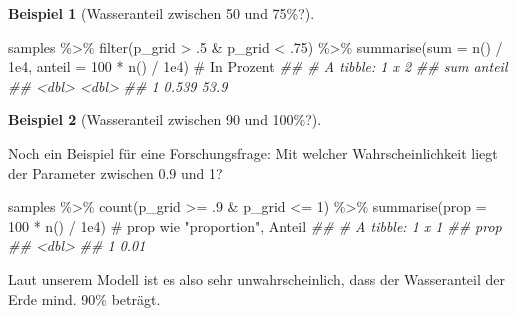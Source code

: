 \documentclass[
  a4paper,
  DIV=11]{scrreprt}
\newenvironment{Shaded}{\begin{snugshade}}{\end{snugshade}}
\newcommand{\AttributeTok}[1]{\textcolor[rgb]{0.40,0.45,0.13}{#1}}
\newcommand{\CommentTok}[1]{\textcolor[rgb]{0.37,0.37,0.37}{#1}}
\newcommand{\DecValTok}[1]{\textcolor[rgb]{0.68,0.00,0.00}{#1}}
\newcommand{\DocumentationTok}[1]{\textcolor[rgb]{0.37,0.37,0.37}{\textit{#1}}}
\newcommand{\FloatTok}[1]{\textcolor[rgb]{0.68,0.00,0.00}{#1}}
\newcommand{\FunctionTok}[1]{\textcolor[rgb]{0.28,0.35,0.67}{#1}}
\newcommand{\NormalTok}[1]{\textcolor[rgb]{0.00,0.23,0.31}{#1}}
\newcommand{\SpecialCharTok}[1]{\textcolor[rgb]{0.37,0.37,0.37}{#1}}
\theoremstyle{definition}
\newtheorem{example}{Beispiel}[chapter]
\theoremstyle{remark}
\begin{document}
\begin{example}[Wasseranteil zwischen 50 und 75\%?]
\begin{Shaded}
\begin{Highlighting}[]
\NormalTok{samples }\SpecialCharTok{\%\textgreater{}\%} 
  \FunctionTok{filter}\NormalTok{(p\_grid }\SpecialCharTok{\textgreater{}}\NormalTok{ .}\DecValTok{5} \SpecialCharTok{\&}\NormalTok{ p\_grid }\SpecialCharTok{\textless{}}\NormalTok{ .}\DecValTok{75}\NormalTok{) }\SpecialCharTok{\%\textgreater{}\%} 
  \FunctionTok{summarise}\NormalTok{(}\AttributeTok{sum     =}       \FunctionTok{n}\NormalTok{() }\SpecialCharTok{/} \FloatTok{1e4}\NormalTok{,}
            \AttributeTok{anteil =} \DecValTok{100} \SpecialCharTok{*} \FunctionTok{n}\NormalTok{() }\SpecialCharTok{/} \FloatTok{1e4}\NormalTok{)  }\CommentTok{\# In Prozent}
\DocumentationTok{\#\# \# A tibble: 1 x 2}
\DocumentationTok{\#\#     sum anteil}
\DocumentationTok{\#\#   \textless{}dbl\textgreater{}  \textless{}dbl\textgreater{}}
\DocumentationTok{\#\# 1 0.539   53.9}
\end{Highlighting}
\end{Shaded}

\end{example}

\leavevmode{}%
\begin{example}[Wasseranteil zwischen 90 und 100\%?]\label{exm-param3}

Noch ein Beispiel für eine Forschungsfrage: Mit welcher
Wahrscheinlichkeit liegt der Parameter zwischen 0.9 und 1?

\begin{Shaded}
\begin{Highlighting}[]
\NormalTok{samples }\SpecialCharTok{\%\textgreater{}\%} 
  \FunctionTok{count}\NormalTok{(p\_grid }\SpecialCharTok{\textgreater{}=}\NormalTok{ .}\DecValTok{9} \SpecialCharTok{\&}\NormalTok{ p\_grid }\SpecialCharTok{\textless{}=} \DecValTok{1}\NormalTok{) }\SpecialCharTok{\%\textgreater{}\%} 
  \FunctionTok{summarise}\NormalTok{(}\AttributeTok{prop =} \DecValTok{100} \SpecialCharTok{*} \FunctionTok{n}\NormalTok{() }\SpecialCharTok{/} \FloatTok{1e4}\NormalTok{)  }\CommentTok{\# prop wie "proportion", Anteil}
\DocumentationTok{\#\# \# A tibble: 1 x 1}
\DocumentationTok{\#\#    prop}
\DocumentationTok{\#\#   \textless{}dbl\textgreater{}}
\DocumentationTok{\#\# 1  0.01}
\end{Highlighting}
\end{Shaded}

Laut unserem Modell ist es also sehr unwahrscheinlich, dass der
Wasseranteil der Erde mind. 90\% beträgt.

\end{example}
\end{document}
